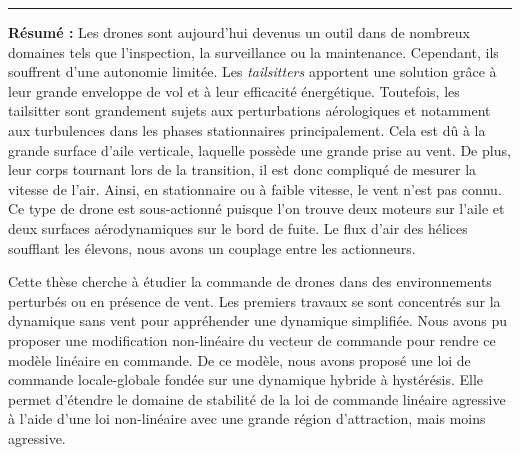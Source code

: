 \pagestyle{empty} %

\begin{vcenterpage} %
\noindent\rule[2pt]{\textwidth}{0.5pt}

{\large\textbf{Résumé :}}
Les drones sont aujourd'hui devenus un outil dans de nombreux domaines tels que l'inspection, la surveillance ou la maintenance. Cependant, ils souffrent d'une autonomie limitée. Les \textit{tailsitters} apportent une solution grâce à leur grande enveloppe de vol et à leur efficacité énergétique. Toutefois, les tailsitter sont grandement sujets aux perturbations aérologiques et notamment aux turbulences dans les phases stationnaires principalement. Cela est dû à la grande surface d'aile verticale, laquelle possède une grande prise au vent. De plus, leur corps tournant lors de la transition, il est donc compliqué de mesurer la vitesse de l'air.  Ainsi, en stationnaire ou à faible vitesse, le vent n'est pas connu. Ce type de drone est sous-actionné puisque l'on trouve deux moteurs sur l'aile et deux surfaces aérodynamiques sur le bord de fuite. Le flux d'air des hélices soufflant les élevons, nous avons un couplage entre les actionneurs.

Cette thèse cherche à étudier la commande de drones dans des environnements perturbés ou en présence de vent. Les premiers travaux se sont concentrés sur la dynamique sans vent pour appréhender une dynamique simplifiée. Nous avons pu proposer une modification non-linéaire du vecteur de commande pour rendre ce modèle linéaire en commande. De ce modèle, nous avons proposé une loi de commande locale-globale fondée sur une dynamique hybride à hystérésis. Elle permet d'étendre le domaine de stabilité de la loi de commande linéaire agressive à l'aide d'une loi non-linéaire avec une grande région d'attraction, mais moins agressive.


\end{vcenterpage}
